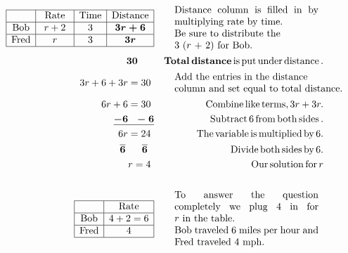 \begin{example}
\begin{eqnarray*}
\begin{array}{|c|c|c|c|}
      \hline
      & \tmop{Rate} & \tmop{Time} & \tmop{Distance}\\
      \hline
      \tmop{Bob} & ~r + 2~ & 3 & \tmmathbf{3 r + 6}\\
      \hline
      \tmop{Fred} & r & 3 & \tmmathbf{3 r}\\
      \hline
    \end{array} &  & \begin{array}{p{0.425\textwidth}}
      \tmop{Distance} \tmop{column} \tmop{is} \tmop{filled} \tmop{in}
      \tmop{by} \tmop{multiplying} \tmop{rate} \tmop{by} \tmop{time}.\\
			\tmop{Be} \tmop{sure} \tmop{to} \tmop{distribute} \tmop{the}\\3 ($r~+$ 2) \tmop{for} \tmop{Bob}.
    \end{array}\\
    \tmmathbf{30}~~~~~  &  &  \tmmathbf{\tmop{Total} \tmop{distance}} \tmop{is} \tmop{put} \tmop{under} \tmop{distance}.\\
    3 r + 6 + 3 r = 30~ &  & \begin{array}{p{0.425\textwidth}}
      \tmop{Add~the~entries~in~the~distance} \tmop{column~and~set~equal~to~total~distance}.
    \end{array}\\
    6 r + 6 = 30~ &  & \tmop{~Combine} \tmop{like} \tmop{terms}, 3 r + 3 r.\\
    \tmmathbf{\underline{- 6 ~~- 6}} &  & \tmop{~Subtract} 6 \tmop{from}
    \tmop{both} \tmop{sides}.\\
    6 r = 24~ &  & \tmop{~The} \tmop{variable} \tmop{is} \tmop{multiplied}
    \tmop{by} 6.\\
    \tmmathbf{\overline{6} ~~~~~ \overline{6}}~~ &  & \tmop{~Divide} \tmop{both}
    \tmop{sides} \tmop{by} 6.\\
    r = 4~ &  & \tmop{~Our} \tmop{solution} \tmop{for} r\\
		& & \\
    \begin{array}{|c|c|}
      \hline
      & \tmop{Rate}\\
      \hline
      \tmop{Bob} & 4 + 2 = 6\\
      \hline
      \tmop{Fred} & 4\\
      \hline
    \end{array} &  & \begin{array}{p{0.425\textwidth}}
      \tmop{To} \tmop{answer} \tmop{the} \tmop{question} \tmop{completely} \tmop{we} \tmop{plug} 4 \tmop{in} \tmop{for} $r$ \tmop{in} \tmop{the} \tmop{table}.\\
			\tmop{Bob} \tmop{traveled} 6 \tmop{miles} \tmop{per} \tmop{hour} \tmop{and} \tmop{Fred} \tmop{traveled} 4 \tmop{mph}.
    \end{array}
  \end{eqnarray*}
\end{example}

